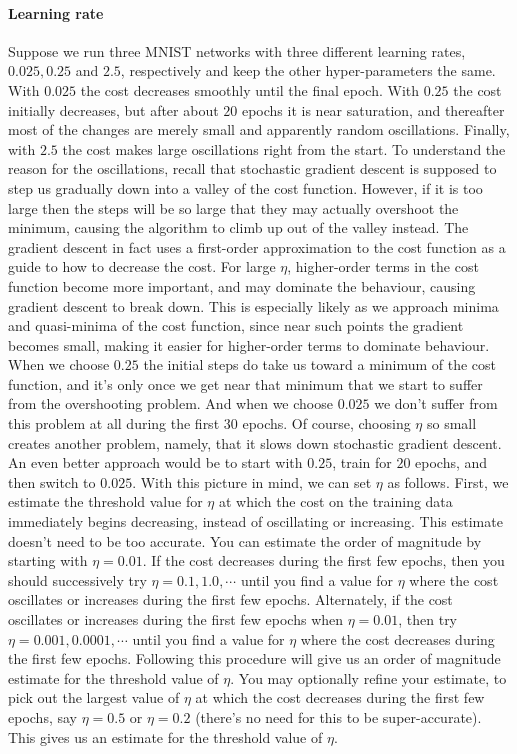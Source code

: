 \documentclass[12pt, letterpaper]{article}
\theoremstyle{definition}
\let\tb\textbf
\begin{document}
\paragraph{\tb{Learning rate}} Suppose we run three MNIST networks with three different learning rates, $0.025, 0.25$ and $2.5$, respectively and keep the other hyper-parameters the same. With $0.025$ the cost decreases smoothly until the final epoch. With $0.25$ the cost initially decreases, but after about $20$ epochs it is near saturation, and thereafter most of the changes are merely small and apparently random oscillations. Finally, with $2.5$ the cost makes large oscillations right from the start. To understand the reason for the oscillations, recall that stochastic gradient descent is supposed to step us gradually down into a valley of the cost function. However, if it is too large then the steps will be so large that they may actually overshoot the minimum, causing the algorithm to climb up out of the valley instead. The gradient descent in fact uses a first-order approximation to the cost function as a guide to how to decrease the cost. For large $\eta$, higher-order terms in the cost function become more important, and may dominate the behaviour, causing gradient descent to break down. This is especially likely as we approach minima and quasi-minima of the cost function, since near such points the gradient becomes small, making it easier for higher-order terms to dominate behaviour. When we choose $0.25$ the initial steps do take us toward a minimum of the cost function, and it's only once we get near that minimum that we start to suffer from the overshooting problem. And when we choose $0.025$ we don't suffer from this problem at all during the first $30$ epochs. Of course, choosing $\eta$ so small creates another problem, namely, that it slows down stochastic gradient descent. An even better approach would be to start with $0.25$, train for $20$ epochs, and then switch to $0.025$.
With this picture in mind, we can set $\eta$ as follows. First, we estimate the threshold value for $\eta$ at which the cost on the training data immediately begins decreasing, instead of oscillating or increasing. This estimate doesn't need to be too accurate. You can estimate the order of magnitude by starting with $\eta=0.01$. If the cost decreases during the first few epochs, then you should successively try $\eta=0.1,1.0,\cdots$ until you find a value for $\eta$ where the cost oscillates or increases during the first few epochs. Alternately, if the cost oscillates or increases during the first few epochs when $\eta=0.01$, then try $\eta=0.001,0.0001,\cdots$ until you find a value for $\eta$ where the cost decreases during the first few epochs. Following this procedure will give us an order of magnitude estimate for the threshold value of $\eta$. You may optionally refine your estimate, to pick out the largest value of $\eta$ at which the cost decreases during the first few epochs, say $\eta=0.5$ or $\eta=0.2$ (there's no need for this to be super-accurate). This gives us an estimate for the threshold value of $\eta$.
 
\end{document}
